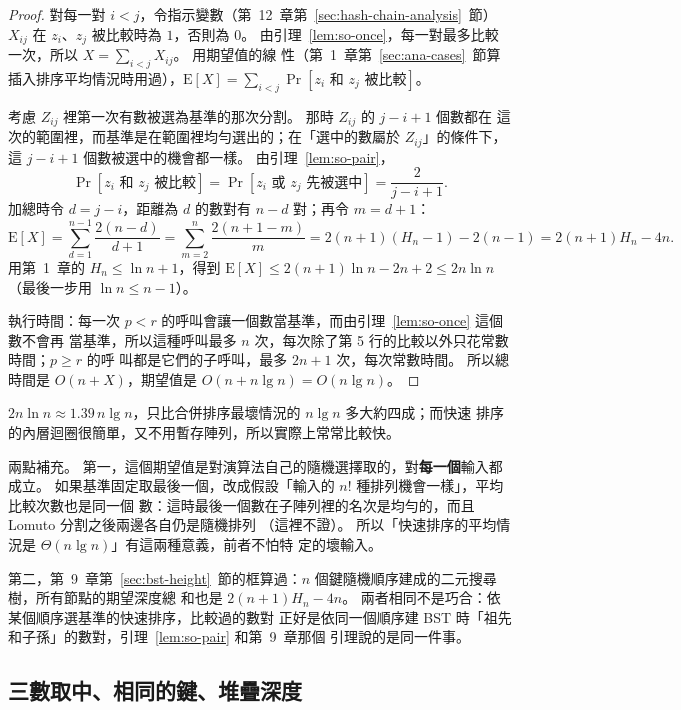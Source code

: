 \begin{proof}
對每一對 $i < j$，令指示變數（第~12~章第~\ref{sec:hash-chain-analysis}~節）$X_{ij}$ 在 $z_i$、$z_j$ 被比較時為 $1$，否則為 $0$。
由引理~\ref{lem:so-once}，每一對最多比較一次，所以 $X = \sum_{i<j} X_{ij}$。 用期望值的線
性（第~1~章第~\ref{sec:ana-cases}~節算插入排序平均情況時用過），$\mathrm{E}[X] = \sum_{i<j} \Pr[z_i
\text{ 和 } z_j \text{ 被比較}]$。

考慮 $Z_{ij}$ 裡第一次有數被選為基準的那次分割。 那時 $Z_{ij}$ 的 $j - i + 1$ 個數都在
這次的範圍裡，而基準是在範圍裡均勻選出的；在「選中的數屬於 $Z_{ij}$」的條件下，這
$j - i + 1$ 個數被選中的機會都一樣。 由引理~\ref{lem:so-pair}，
\[
\Pr[z_i \text{ 和 } z_j \text{ 被比較}] = \Pr[z_i \text{ 或 } z_j \text{ 先被選中}] = \frac{2}{j - i + 1}.
\]
加總時令 $d = j - i$，距離為 $d$ 的數對有 $n - d$ 對；再令 $m = d + 1$：
\[
\mathrm{E}[X] = \sum_{d=1}^{n-1} \frac{2(n - d)}{d + 1}
= \sum_{m=2}^{n} \frac{2(n + 1 - m)}{m}
= 2(n+1)(H_n - 1) - 2(n - 1)
= 2(n+1)H_n - 4n .
\]
用第~1~章的 $H_n \le \ln n + 1$，得到 $\mathrm{E}[X] \le 2(n+1)\ln n - 2n + 2 \le 2n\ln n$
（最後一步用 $\ln n \le n - 1$）。

執行時間：每一次 $p < r$ 的呼叫會讓一個數當基準，而由引理~\ref{lem:so-once} 這個數不會再
當基準，所以這種呼叫最多 $n$ 次，每次除了第 5 行的比較以外只花常數時間；$p \ge r$ 的呼
叫都是它們的子呼叫，最多 $2n + 1$ 次，每次常數時間。 所以總時間是 $O(n + X)$，期望值是
$O(n + n \lg n) = O(n \lg n)$。
\end{proof}

$2n \ln n \approx 1.39\, n \lg n$，只比合併排序最壞情況的 $n \lg n$ 多大約四成；而快速
排序的內層迴圈很簡單，又不用暫存陣列，所以實際上常常比較快。

兩點補充。 第一，這個期望值是對演算法自己的隨機選擇取的，對\textbf{每一個}輸入都成立。
如果基準固定取最後一個，改成假設「輸入的 $n!$ 種排列機會一樣」，平均比較次數也是同一個
數：這時最後一個數在子陣列裡的名次是均勻的，而且 Lomuto 分割之後兩邊各自仍是隨機排列
（這裡不證）。 所以「快速排序的平均情況是 $\Theta(n \lg n)$」有這兩種意義，前者不怕特
定的壞輸入。

第二，第~9~章第~\ref{sec:bst-height}~節的框算過：$n$ 個鍵隨機順序建成的二元搜尋樹，所有節點的期望深度總
和也是 $2(n+1)H_n - 4n$。 兩者相同不是巧合：依某個順序選基準的快速排序，比較過的數對
正好是依同一個順序建 BST 時「祖先和子孫」的數對，引理~\ref{lem:so-pair} 和第~9~章那個
引理說的是同一件事。

\subsection{三數取中、相同的鍵、堆疊深度}

